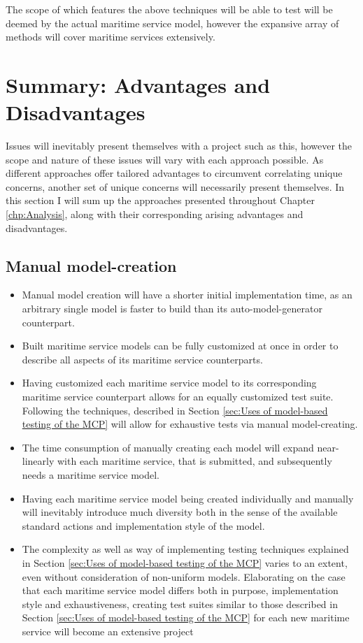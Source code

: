 The scope of which features the above techniques will be able to test will be deemed by the actual maritime service model, however the expansive array of methods will cover maritime services extensively.
\section{Summary: Advantages and Disadvantages} 
Issues will inevitably present themselves with a project such as this, however the scope and nature of these issues will vary with each approach possible. As different approaches offer tailored advantages to circumvent correlating unique concerns, another set of unique concerns will necessarily present themselves. In this section I will sum up the approaches presented throughout Chapter \ref{chp:Analysis}, along with their corresponding arising advantages and disadvantages.
\subsection{Manual model-creation}
\begin{itemize}
	\item Manual model creation will have a shorter initial implementation time, as an arbitrary single model is faster to build than its auto-model-generator counterpart. 
	\item Built maritime service models can be fully customized at once in order to describe all aspects of its maritime service counterparts.
	\item Having customized each maritime service model to its corresponding maritime service counterpart allows for an equally customized test suite. Following the techniques, described in Section \ref{sec:Uses of model-based testing of the MCP} will allow for exhaustive tests via manual model-creating.
\end{itemize}
\begin{itemize}
	\item The time consumption of manually creating each model will expand near-linearly with each maritime service, that is submitted, and subsequently needs a maritime service model. 
	\item Having each maritime service model being created individually and manually will inevitably introduce much diversity both in the sense of the available standard actions and implementation style of the model.
	\item The complexity as well as way of implementing testing techniques explained in Section \ref{sec:Uses of model-based testing of the MCP} varies to an extent, even without consideration of non-uniform models. Elaborating on the case that each maritime service model differs both in purpose, implementation style and exhaustiveness, creating test suites similar to those described in Section \ref{sec:Uses of model-based testing of the MCP} for each new maritime service will become an extensive project
\end{itemize}\newpage
